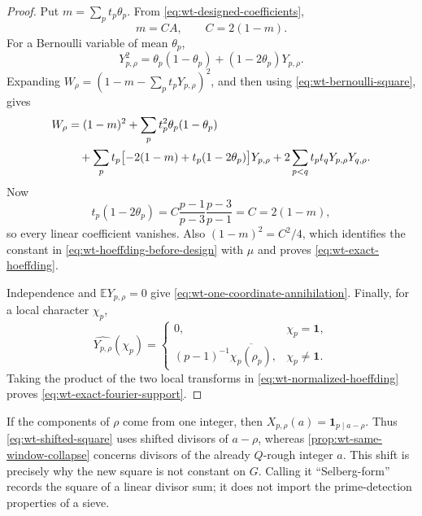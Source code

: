 \begin{proof}
Put $m=\sum_pt_p\theta_p$.  From
\eqref{eq:wt-designed-coefficients},
\begin{equation}
 m=CA,
 \qquad
 C=2(1-m).
 \label{eq:wt-C-relation}
\end{equation}
For a Bernoulli variable of mean $\theta_p$,
\begin{equation}
 Y_{p,\rho}^2
 =\theta_p(1-\theta_p)+(1-2\theta_p)Y_{p,\rho}.
 \label{eq:wt-bernoulli-square}
\end{equation}
Expanding $W_\rho=(1-m-\sum_pt_pY_{p,\rho})^2$, and then using
\eqref{eq:wt-bernoulli-square}, gives
\begin{align}
 W_\rho
 &= (1-m)^2+\sum_p t_p^2\theta_p(1-\theta_p) \notag\\
 &\quad+
 \sum_p t_p\bigl[-2(1-m)+t_p(1-2\theta_p)\bigr]Y_{p,\rho}
 +2\sum_{p<q}t_pt_qY_{p,\rho}Y_{q,\rho}.
 \label{eq:wt-hoeffding-before-design}
\end{align}
Now
\begin{equation}
 t_p(1-2\theta_p)
 =C\frac{p-1}{p-3}\frac{p-3}{p-1}=C=2(1-m),
 \label{eq:wt-linear-cancellation}
\end{equation}
so every linear coefficient vanishes.  Also $(1-m)^2=C^2/4$,
which identifies the constant in \eqref{eq:wt-hoeffding-before-design} with
$\mu$ and proves \eqref{eq:wt-exact-hoeffding}.

Independence and $\mathbb E Y_{p,\rho}=0$ give
\eqref{eq:wt-one-coordinate-annihilation}.  Finally, for a local character
$\chi_p$,
\begin{equation}
 \widehat{Y_{p,\rho}}(\chi_p)
 =\begin{cases}
 0,&\chi_p=\mathbf1,\\
 (p-1)^{-1}\overline{\chi_p(\rho_p)},&\chi_p\ne\mathbf1.
 \end{cases}
 \label{eq:wt-local-Y-transform}
\end{equation}
Taking the product of the two local transforms in
\eqref{eq:wt-normalized-hoeffding} proves
\eqref{eq:wt-exact-fourier-support}.
\end{proof}

\begin{remark}
\label{rem:wt-not-standard-same-window}
If the components of $\rho$ come from one integer, then
$X_{p,\rho}(a)=\mathbf1_{p\mid a-\rho}$.  Thus
\eqref{eq:wt-shifted-square} uses shifted divisors of $a-\rho$, whereas
\cref{prop:wt-same-window-collapse} concerns divisors of the already
$Q$-rough integer $a$.  This shift is precisely why the new square is not
constant on $G$.  Calling it ``Selberg-form'' records the square of a linear
divisor sum; it does not import the prime-detection properties of a sieve.
\end{remark}

